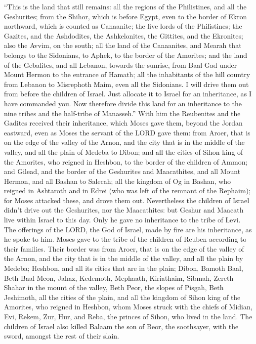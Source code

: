  ``This is the land that still remains: all the regions of
the Philistines, and all the Geshurites;  from the Shihor,
which is before Egypt, even to the border of Ekron northward, which is
counted as Canaanite; the five lords of the Philistines; the Gazites,
and the Ashdodites, the Ashkelonites, the Gittites, and the Ekronites;
also the Avvim,  on the south; all the land of the
Canaanites, and Mearah that belongs to the Sidonians, to Aphek, to the
border of the Amorites;  and the land of the Gebalites, and
all Lebanon, towards the sunrise, from Baal Gad under Mount Hermon to
the entrance of Hamath;  all the inhabitants of the hill
country from Lebanon to Misrephoth Maim, even all the Sidonians. I will
drive them out from before the children of Israel. Just allocate it to
Israel for an inheritance, as I have commanded you.  Now
therefore divide this land for an inheritance to the nine tribes and the
half-tribe of Manasseh.''  With him the Reubenites and the
Gadites received their inheritance, which Moses gave them, beyond the
Jordan eastward, even as Moses the servant of the LORD gave them:
 from Aroer, that is on the edge of the valley of the Arnon,
and the city that is in the middle of the valley, and all the plain of
Medeba to Dibon;  and all the cities of Sihon king of the
Amorites, who reigned in Heshbon, to the border of the children of
Ammon;  and Gilead, and the border of the Geshurites and
Maacathites, and all Mount Hermon, and all Bashan to Salecah;
 all the kingdom of Og in Bashan, who reigned in Ashtaroth
and in Edrei (who was left of the remnant of the Rephaim); for Moses
attacked these, and drove them out.  Nevertheless the
children of Israel didn't drive out the Geshurites, nor the Maacathites:
but Geshur and Maacath live within Israel to this day. 
Only he gave no inheritance to the tribe of Levi. The offerings of the
LORD, the God of Israel, made by fire are his inheritance, as he spoke
to him.  Moses gave to the tribe of the children of Reuben
according to their families.  Their border was from Aroer,
that is on the edge of the valley of the Arnon, and the city that is in
the middle of the valley, and all the plain by Medeba; 
Heshbon, and all its cities that are in the plain; Dibon, Bamoth Baal,
Beth Baal Meon,  Jahaz, Kedemoth, Mephaath, 
Kiriathaim, Sibmah, Zereth Shahar in the mount of the valley,
 Beth Peor, the slopes of Pisgah, Beth Jeshimoth,
 all the cities of the plain, and all the kingdom of Sihon
king of the Amorites, who reigned in Heshbon, whom Moses struck with the
chiefs of Midian, Evi, Rekem, Zur, Hur, and Reba, the princes of Sihon,
who lived in the land.  The children of Israel also killed
Balaam the son of Beor, the soothsayer, with the sword, amongst the rest
of their slain.

